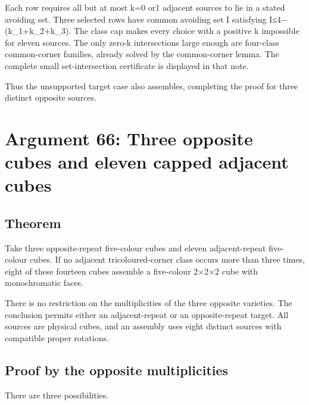 \documentclass[
  10pt,
]{article}
\begin{document}
Each row requires all but at most k=0 or1 adjacent sources to lie in a
stated avoiding set. Three selected rows have common avoiding set I
satisfying \textbar I\textbar≤4−(k\_1+k\_2+k\_3). The class cap makes
every choice with a positive k impossible for eleven sources. The only
zero-k intersections large enough are four-class common-corner families,
already solved by the common-corner lemma. The complete small
set-intersection certificate is displayed in that note.

Thus the unsupported target case also assembles, completing the proof
for three distinct opposite sources.

\hypertarget{arg-66}{%
\section{Argument 66: Three opposite cubes and eleven capped adjacent
cubes}\label{arg-66}}

\hypertarget{theorem-6}{%
\subsection*{Theorem}\label{theorem-6}}

Take three opposite-repeat five-colour cubes and eleven adjacent-repeat
five-colour cubes. If no adjacent tricoloured-corner class occurs more
than three times, eight of these fourteen cubes assemble a five-colour
2×2×2 cube with monochromatic faces.

There is no restriction on the multiplicities of the three opposite
varieties. The conclusion permits either an adjacent-repeat or an
opposite-repeat target. All sources are physical cubes, and an assembly
uses eight distinct sources with compatible proper rotations.

\hypertarget{proof-by-the-opposite-multiplicities}{%
\subsection*{Proof by the opposite
multiplicities}\label{proof-by-the-opposite-multiplicities}}

There are three possibilities.
\end{document}
